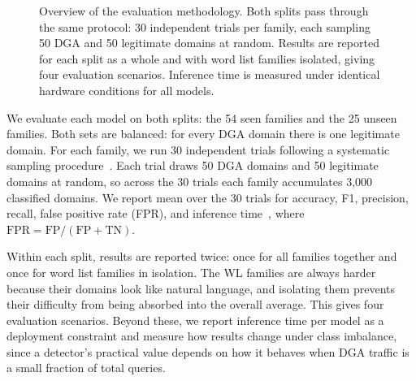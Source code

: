 \documentclass[conference]{IEEEtran}
\begin{document}
\begin{figure}[!t]

\caption{Overview of the evaluation methodology. Both splits pass through the same protocol: 30 independent trials per family, each sampling 50 DGA and 50 legitimate domains at random. Results are reported for each split as a whole and with word list families isolated, giving four evaluation scenarios. Inference time is measured under identical hardware conditions for all models.}
\label{fig:methodology}
\end{figure}

We evaluate each model on both splits: the 54 seen families and the 25 unseen families. Both sets are balanced: for every DGA domain there is one legitimate domain. For each family, we run 30 independent trials following a systematic sampling procedure~\cite{cochran1977sampling}. Each trial draws 50 DGA domains and 50 legitimate domains at random, so across the 30 trials each family accumulates 3,000 classified domains. We report mean over the 30 trials for accuracy, F1, precision, recall, false positive rate (FPR), and inference time~\cite{hossin2015review}, where $\text{FPR} = \text{FP}/(\text{FP}+\text{TN})$.

Within each split, results are reported twice: once for all families together and once for word list families in isolation. The WL families are always harder because their domains look like natural language, and isolating them prevents their difficulty from being absorbed into the overall average. This gives four evaluation scenarios. Beyond these, we report inference time per model as a deployment constraint and measure how results change under class imbalance, since a detector's practical value depends on how it behaves when DGA traffic is a small fraction of total queries.
\end{document}
